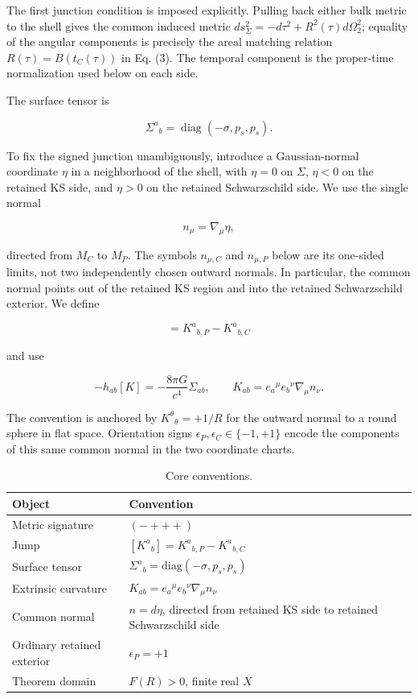 \documentclass[pdflatex,sn-mathphys-num]{sn-jnl}
\begin{document}
The first junction condition is imposed explicitly. Pulling back either bulk metric to the shell gives the common induced metric \(ds_\Sigma^2=-d\tau^2+R^2(\tau)d\Omega_2^2\); equality of the angular components is precisely the areal matching relation \(R(\tau)=B(t_C(\tau))\) in Eq. (3). The temporal component is the proper-time normalization used below on each side.


The surface tensor is


\begin{equation}
\Sigma^a{}_b=\operatorname{diag}(-\sigma,p_s,p_s).
\tag{6}
\end{equation}

To fix the signed junction unambiguously, introduce a Gaussian-normal coordinate \(\eta\) in a neighborhood of the shell, with \(\eta=0\) on \(\Sigma\), \(\eta<0\) on the retained KS side, and \(\eta>0\) on the retained Schwarzschild side. We use the single normal


\[
n_\mu=\nabla_\mu\eta,
\]

directed from \(M_C\) to \(M_P\). The symbols \(n_{\mu,C}\) and \(n_{\mu,P}\) below are its one-sided limits, not two independently chosen outward normals. In particular, the common normal points out of the retained KS region and into the retained Schwarzschild exterior. We define


\begin{equation}
[K^a{}_b]=K^a{}_{b,P}-K^a{}_{b,C}
\tag{7}
\end{equation}

and use


\begin{equation}
[K_{ab}]-h_{ab}[K]
=-\frac{8\pi G}{c^4}\Sigma_{ab},
\qquad
K_{ab}=e_a{}^\mu e_b{}^\nu\nabla_\mu n_\nu.
\tag{8}
\end{equation}

The convention is anchored by \(K^\theta{}_\theta=+1/R\) for the outward normal to a round sphere in flat space. Orientation signs \(\epsilon_P,\epsilon_C\in\{-1,+1\}\) encode the components of this same common normal in the two coordinate charts.



\begin{table}[t]
\centering
\caption{Core conventions.}
\small
\begin{tabularx}{\textwidth}{@{}XX@{}}
\toprule
Object & Convention \\
\midrule
Metric signature & \((-+++ )\) \\
Jump & \([K^a{}_b]=K^a{}_{b,P}-K^a{}_{b,C}\) \\
Surface tensor & \(\Sigma^a{}_b=\mathrm{diag}(-\sigma,p_s,p_s)\) \\
Extrinsic curvature & \(K_{ab}=e_a{}^\mu e_b{}^\nu\nabla_\mu n_\nu\) \\
Common normal & \(n=d\eta\), directed from retained KS side to retained Schwarzschild side \\
Ordinary retained exterior & \(\epsilon_P=+1\) \\
Theorem domain & \(F(R)>0\), finite real \(X\) \\
\bottomrule
\end{tabularx}
\end{table}
\end{document}
